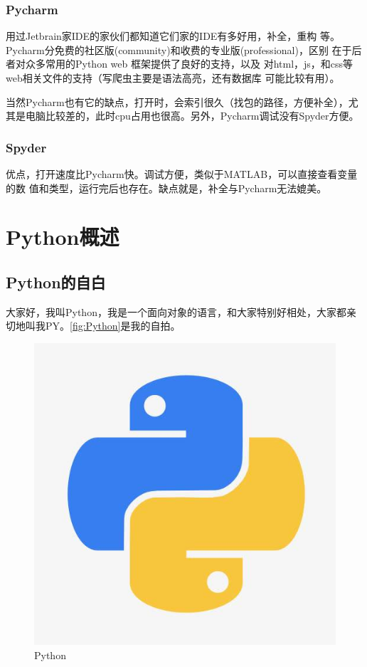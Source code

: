 \documentclass[11pt,UTF8,oneside]{mybook}
\begin{document}
\subsection{Pycharm}

用过Jetbrain家IDE的家伙们都知道它们家的IDE有多好用，补全，重构
等。Pycharm分免费的社区版(community)和收费的专业版(professional)，区别
在于后者对众多常用的Python web 框架提供了良好的支持，以及
对html，js，和css等web相关文件的支持（写爬虫主要是语法高亮，还有数据库
可能比较有用）。

当然Pycharm也有它的缺点，打开时，会索引很久（找包的路径，方便补全），尤
其是电脑比较差的，此时cpu占用也很高。另外，Pycharm调试没有Spyder方便。

\subsection{Spyder}
优点，打开速度比Pycharm快。调试方便，类似于MATLAB，可以直接查看变量的数
值和类型，运行完后也存在。缺点就是，补全与Pycharm无法媲美。


\chapter{Python概述}
\label{chap:introduction}


\section{Python的自白}
\label{sec:introduction_for_Python}

大家好，我叫Python，我是一个面向对象的语言，和大家特别好相处，大家都亲
切地叫我PY。\autoref{fig:Python}是我的自拍。
\begin{figure}[htb]
  \centering
  \includegraphics[width=.4\textwidth]{./figure/Python.jpeg}
  \caption{Python}
  \label{fig:Python}
\end{figure}
\end{document}
